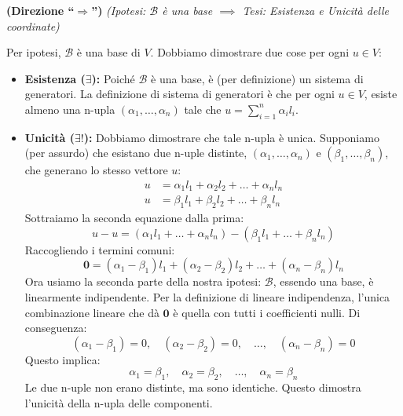 {{        \bigskip %
        
        \textbf{(Direzione ``\(\Rightarrow\)'')}
        \textit{(Ipotesi: \(\mathcal{B}\) è una base \(\implies\) Tesi: Esistenza e Unicità delle coordinate)}
        
        Per ipotesi, \(\mathcal{B}\) è una base di \(V\). Dobbiamo dimostrare due cose per ogni \(u \in V\):
        
        \begin{itemize}
            \item \textbf{Esistenza (\(\exists\)):}
            Poiché \(\mathcal{B}\) è una base, è (per definizione) un sistema di generatori. La definizione di sistema di generatori è che per ogni \(u \in V\), esiste almeno una n-upla \((\alpha_1, \dots, \alpha_n)\) tale che \(u = \sum_{i=1}^n \alpha_i l_i\).
            
            \item \textbf{Unicità (\(\exists!\)):}
            Dobbiamo dimostrare che tale n-upla è unica. Supponiamo (per assurdo) che esistano due n-uple distinte, \((\alpha_1, \dots, \alpha_n)\) e \((\beta_1, \dots, \beta_n)\), che generano lo stesso vettore \(u\):
            \begin{align*}
                u &= \alpha_1 l_1 + \alpha_2 l_2 + \dots + \alpha_n l_n \\
                u &= \beta_1 l_1 + \beta_2 l_2 + \dots + \beta_n l_n
            \end{align*}
            Sottraiamo la seconda equazione dalla prima:
            \[ u - u = (\alpha_1 l_1 + \dots + \alpha_n l_n) - (\beta_1 l_1 + \dots + \beta_n l_n) \]
            Raccogliendo i termini comuni:
            \[ \mathbf{0} = (\alpha_1 - \beta_1) l_1 + (\alpha_2 - \beta_2) l_2 + \dots + (\alpha_n - \beta_n) l_n \]
            Ora usiamo la seconda parte della nostra ipotesi: \(\mathcal{B}\), essendo una base, è linearmente indipendente.
            Per la definizione di lineare indipendenza, l'unica combinazione lineare che dà \(\mathbf{0}\) è quella con tutti i coefficienti nulli. Di conseguenza:
            \[
            (\alpha_1 - \beta_1) = 0, \quad (\alpha_2 - \beta_2) = 0, \quad \dots, \quad (\alpha_n - \beta_n) = 0
            \]
            Questo implica:
            \[
            \alpha_1 = \beta_1, \quad \alpha_2 = \beta_2, \quad \dots, \quad \alpha_n = \beta_n
            \]
            Le due n-uple non erano distinte, ma sono identiche. Questo dimostra l'unicità della n-upla delle componenti.
        \end{itemize}
    }
}

